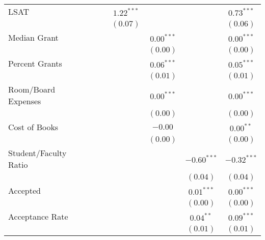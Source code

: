 \begin{table}
\begin{center}
\begin{tabular}{l c c c c c c }
LSAT                  &               &               & $1.22^{***}$    &               &               & $0.73^{***}$    \\
                      &               &               & $(0.07)$        &               &               & $(0.06)$        \\
Median Grant          &               &               &                 & $0.00^{***}$  &               & $0.00^{***}$    \\
                      &               &               &                 & $(0.00)$      &               & $(0.00)$        \\
Percent Grants        &               &               &                 & $0.06^{***}$  &               & $0.05^{***}$    \\
                      &               &               &                 & $(0.01)$      &               & $(0.01)$        \\
Room/Board Expenses   &               &               &                 & $0.00^{***}$  &               & $0.00^{***}$    \\
                      &               &               &                 & $(0.00)$      &               & $(0.00)$        \\
Cost of Books         &               &               &                 & $-0.00$       &               & $0.00^{**}$     \\
                      &               &               &                 & $(0.00)$      &               & $(0.00)$        \\
Student/Faculty Ratio &               &               &                 &               & $-0.60^{***}$ & $-0.32^{***}$   \\
                      &               &               &                 &               & $(0.04)$      & $(0.04)$        \\
Accepted              &               &               &                 &               & $0.01^{***}$  & $0.00^{***}$    \\
                      &               &               &                 &               & $(0.00)$      & $(0.00)$        \\
Acceptance Rate       &               &               &                 &               & $0.04^{**}$   & $0.09^{***}$    \\
                      &               &               &                 &               & $(0.01)$      & $(0.01)$        \\

\end{tabular}
\end{center}
\end{table}
